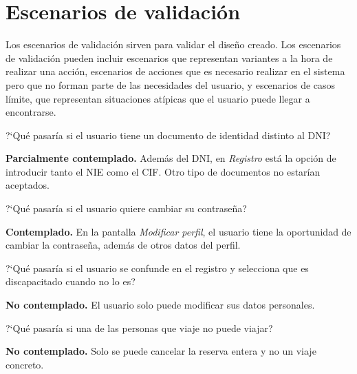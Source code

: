 \section{Escenarios de validación}

Los escenarios de validación sirven para validar el diseño creado. Los escenarios de validación
pueden incluir escenarios que representan variantes a la hora de realizar una acción, escenarios
de acciones que es necesario realizar en el sistema pero que no forman parte de las necesidades
del usuario, y escenarios de casos límite, que representan situaciones atípicas que el usuario
puede llegar a encontrarse.

\begin{escenario} %
    \centering
?`Qué pasaría si el usuario tiene un documento de identidad distinto al DNI?

\begin{solucion}
    \centering
    \textbf{Parcialmente contemplado.} Además del DNI, en \textit{Registro} está la opción de introducir tanto el NIE como el CIF. Otro tipo de documentos no estarían aceptados.
\end{solucion}
\end{escenario}

\begin{escenario} %
    \centering
?`Qué pasaría si el usuario quiere cambiar su contraseña?

\begin{solucion}
    \centering
    \textbf{Contemplado.} En la pantalla \textit{Modificar perfil}, el usuario tiene la oportunidad de cambiar la contraseña, además de otros datos del perfil.
\end{solucion}
\end{escenario}

\begin{escenario} %
    \centering
?`Qué pasaría si el usuario se confunde en el registro y selecciona que es discapacitado cuando no lo es?

\begin{solucion}
    \centering
    \textbf{No contemplado.} El usuario solo puede modificar sus datos personales.
\end{solucion}
\end{escenario}

\begin{escenario} %
    \centering
?`Qué pasaría si una de las personas que viaje no puede viajar?

\begin{solucion}
    \centering
    \textbf{No contemplado.} Solo se puede cancelar la reserva entera y no un viaje concreto.
\end{solucion}
\end{escenario}


